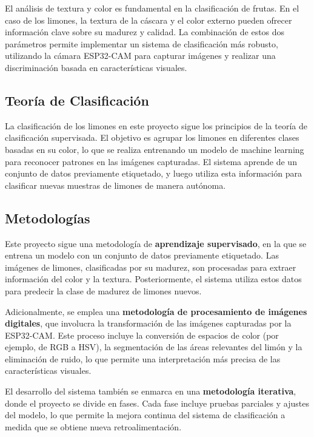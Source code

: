 El análisis de textura y color es fundamental en la clasificación de frutas. En el caso de los limones, la textura de la cáscara y el color externo pueden ofrecer información clave sobre su madurez y calidad. La combinación de estos dos parámetros permite implementar un sistema de clasificación más robusto, utilizando la cámara ESP32-CAM para capturar imágenes y realizar una discriminación basada en características visuales.

\subsection{Teoría de Clasificación}

La clasificación de los limones en este proyecto sigue los principios de la teoría de clasificación supervisada. El objetivo es agrupar los limones en diferentes clases basadas en su color, lo que se realiza entrenando un modelo de machine learning para reconocer patrones en las imágenes capturadas. El sistema aprende de un conjunto de datos previamente etiquetado, y luego utiliza esta información para clasificar nuevas muestras de limones de manera autónoma.

\subsection{Metodologías}

Este proyecto sigue una metodología de \textbf{aprendizaje supervisado}, en la que se entrena un modelo con un conjunto de datos previamente etiquetado. Las imágenes de limones, clasificadas por su madurez, son procesadas para extraer información del color y la textura. Posteriormente, el sistema utiliza estos datos para predecir la clase de madurez de limones nuevos. 

Adicionalmente, se emplea una \textbf{metodología de procesamiento de imágenes digitales}, que involucra la transformación de las imágenes capturadas por la ESP32-CAM. Este proceso incluye la conversión de espacios de color (por ejemplo, de RGB a HSV), la segmentación de las áreas relevantes del limón y la eliminación de ruido, lo que permite una interpretación más precisa de las características visuales.

El desarrollo del sistema también se enmarca en una \textbf{metodología iterativa}, donde el proyecto se divide en fases. Cada fase incluye pruebas parciales y ajustes del modelo, lo que permite la mejora continua del sistema de clasificación a medida que se obtiene nueva retroalimentación.

